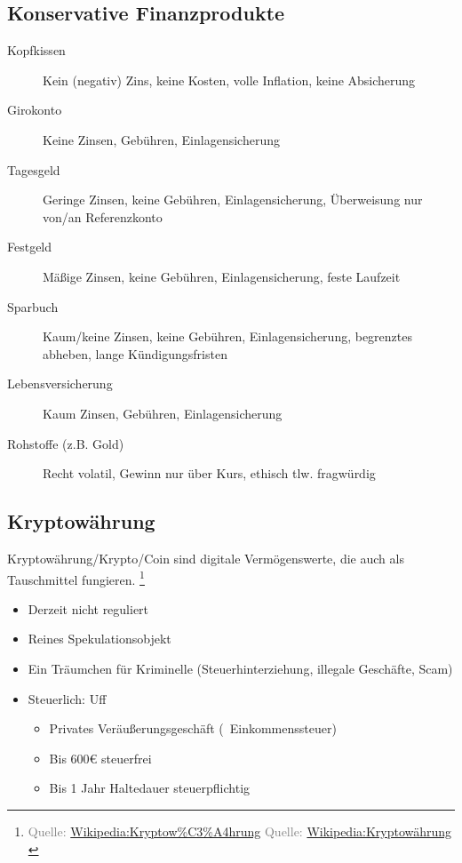 \documentclass{beamer}
\let\oldfootnote\footnote
\renewcommand{\footnote}[1]
{%
	\oldfootnote
	{
		\tiny
		\textcolor{gray}{#1}
	}%
}
\newcommand{\citewiki}[2][]
{%
	\footnote
	{
		\ifthenelse{\isempty{#1}}
		{
			Quelle: \href{https://de.wikipedia.org/wiki/#2}{Wikipedia:#2}
		}
		{
			Quelle: \href{https://de.wikipedia.org/wiki/#2}{Wikipedia:#1}
		}
	}
}
\begin{document}
		\subsection{Konservative Finanzprodukte}
		
			\begin{frame}
				\begin{description}
					\item[Kopfkissen] Kein (negativ) Zins, keine Kosten, volle Inflation, keine Absicherung\pause
					\item[Girokonto] Keine Zinsen, Gebühren, Einlagensicherung\pause
					\item[Tagesgeld] Geringe Zinsen, keine Gebühren, Einlagensicherung, Überweisung nur von/an Referenzkonto\pause
					\item[Festgeld] Mäßige Zinsen, keine Gebühren, Einlagensicherung, feste Laufzeit\pause
					\item[Sparbuch] Kaum/keine Zinsen, keine Gebühren, Einlagensicherung, begrenztes abheben, lange Kündigungsfristen\pause
					\item[Lebensversicherung] Kaum Zinsen, Gebühren, Einlagensicherung\pause
					\item[Rohstoffe (z.B. Gold)] Recht volatil, Gewinn nur über Kurs, ethisch tlw. fragwürdig
				\end{description}
			\end{frame}
		
		\subsection{Kryptowährung}
		
			\begin{frame}
				\begin{definition}
					Kryptowährung/Krypto/Coin sind digitale Vermögenswerte, die auch als Tauschmittel fungieren.\citewiki[Kryptowährung]{Kryptow\%C3\%A4hrung}
				\end{definition}
			
				\begin{itemize}
					\item Derzeit nicht reguliert
					\item Reines Spekulationsobjekt
					\item Ein Träumchen für Kriminelle (Steuerhinterziehung, illegale Geschäfte, Scam)
					\item Steuerlich: Uff
					\begin{itemize}
						\item Privates Veräußerungsgeschäft (\textrightarrow\ Einkommenssteuer)
						\item Bis 600€ steuerfrei
						\item Bis 1 Jahr Haltedauer steuerpflichtig
					\end{itemize}
				\end{itemize}
			\end{frame}
	
\end{document}
